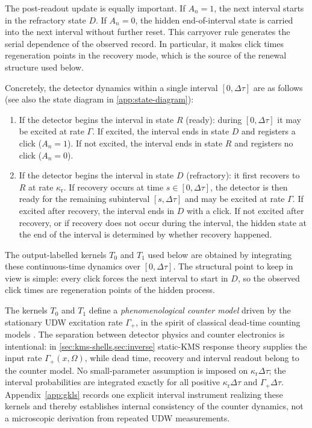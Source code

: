 \documentclass[11pt]{article}
\theoremstyle{definition}
\begin{document}
The post-readout update is equally important. If $A_n=1$, the next interval starts in the refractory state $D$. If $A_n=0$, the hidden end-of-interval state is carried into the next interval without further reset. This carryover rule generates the serial dependence of the observed record. In particular, it makes click times regeneration points in the recovery mode, which is the source of the renewal structure used below.

Concretely, the detector dynamics within a single interval $[0,\Delta\tau]$ are as follows (see also the state diagram in \cref{app:state-diagram}):
\begin{enumerate}[label=\textup{(\alph*)},leftmargin=2.0em,itemsep=0.2em]
\item If the detector begins the interval in state $R$ (ready): during $[0,\Delta\tau]$ it may be excited at rate $\Gamma$. If excited, the interval ends in state $D$ and registers a click ($A_n=1$). If not excited, the interval ends in state $R$ and registers no click ($A_n=0$).
\item If the detector begins the interval in state $D$ (refractory): it first recovers to $R$ at rate $\kappa_{\mathrm r}$. If recovery occurs at time $s\in[0,\Delta\tau]$, the detector is then ready for the remaining subinterval $[s,\Delta\tau]$ and may be excited at rate $\Gamma$. If excited after recovery, the interval ends in $D$ with a click. If not excited after recovery, or if recovery does not occur during the interval, the hidden state at the end of the interval is determined by whether recovery happened.
\end{enumerate}
The output-labelled kernels $T_0$ and $T_1$ used below are obtained by integrating these continuous-time dynamics over $[0,\Delta\tau]$. The structural point to keep in view is simple: every click forces the next interval to start in $D$, so the observed click times are regeneration points of the hidden process.

The kernels $T_0$ and $T_1$ define a \emph{phenomenological counter model} driven by the stationary UDW excitation rate $\Gamma_+$, in the spirit of classical dead-time counting models \cite{Muller1973,CantorTeich1975,CarmichaelWaiting1989,KimbleAntibunching1977}. The separation between detector physics and counter electronics is intentional: in \cref{sec:kms-shells,sec:inverse} static-KMS response theory supplies the input rate $\Gamma_+(x,\Omega)$, while dead time, recovery and interval readout belong to the counter model. No small-parameter assumption is imposed on $\kappa_{\mathrm r}\Delta\tau$; the interval probabilities are integrated exactly for all positive $\kappa_{\mathrm r}\Delta\tau$ and $\Gamma_+\Delta\tau$. Appendix~\ref{app:gkls} records one explicit interval instrument realizing these kernels and thereby establishes internal consistency of the counter dynamics, not a microscopic derivation from repeated UDW measurements.
\end{document}
